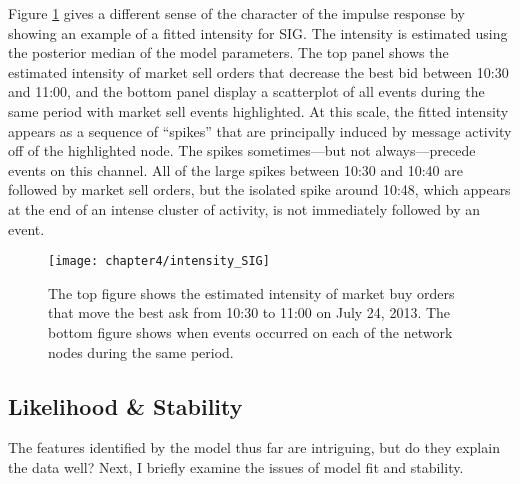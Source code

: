 		Figure \ref{fig:intensity_SIG} gives a different sense of the character of the impulse response by showing an example of a fitted intensity for SIG. The intensity is estimated using the posterior median of the model parameters. The top panel shows the estimated intensity of market sell orders that decrease the best bid between 10:30 and 11:00, and the bottom panel display a scatterplot of all events during the same period with market sell events highlighted. At this scale, the fitted intensity appears as a sequence of ``spikes'' that are principally induced by message activity off of the highlighted node. The spikes sometimes---but not always---precede events on this channel. All of the large spikes between 10:30 and 10:40 are followed by market sell orders, but the isolated spike around 10:48, which appears at the end of an intense cluster of activity, is not immediately followed by an event.

		\begin{figure}[p]
			\small
			\linespread{1}
			\centering
			\texttt{[image: chapter4/intensity\_SIG]}
			\captionsetup{skip=-20pt, labelsep=colon, font=footnotesize, width=\linewidth}
			\caption[Fitted intensity: SIG]{The top figure shows the estimated intensity of market buy orders that move the best ask from 10:30 to 11:00 on July 24, 2013. The bottom figure shows when events occurred on each of the network nodes during the same period.}
			\label{fig:intensity_SIG}
		\end{figure}

	\subsection{Likelihood \& Stability}
		The features identified by the model thus far are intriguing, but do they explain the data well? Next, I briefly examine the issues of model fit and stability.

